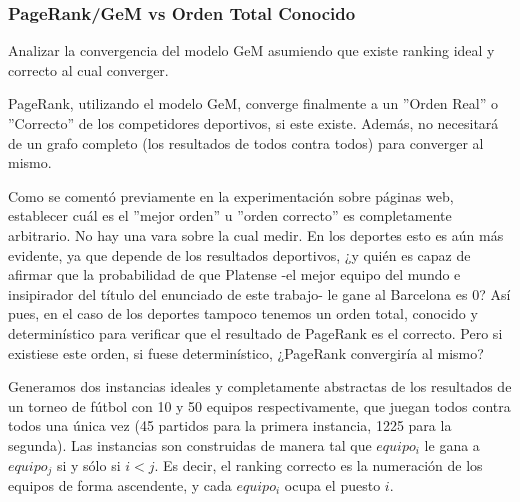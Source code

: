 \subsubsection{PageRank/GeM vs Orden Total Conocido}
\label{subsec:exp5}
\begin{LaTeXdescription}
    \item[Objetivo] Analizar la convergencia del modelo GeM asumiendo que
        existe ranking ideal y correcto al cual converger.\\

    \item[Hip\'otesis] PageRank, utilizando el modelo GeM, converge finalmente a
        un ''Orden Real'' o ''Correcto'' de los competidores deportivos, si este existe.
        Adem\'as, no necesitar\'a de un grafo completo (los resultados de todos
        contra todos) para converger al mismo.\\

    \item[Proposici\'on] Como se coment\'o previamente en la experimentaci\'on
        sobre p\'aginas web, establecer cuál es el ''mejor orden'' u ''orden
        correcto'' es completamente arbitrario. No hay una vara sobre la cual
        medir. En los deportes esto es a\'un más evidente, ya que depende de
        los resultados deportivos, ¿y qui\'en es capaz de afirmar que la
        probabilidad de que Platense -el mejor equipo del mundo e insipirador
        del t\'itulo del enunciado de este trabajo- le gane al Barcelona es $0$?
        As\'i pues, en el caso de los deportes tampoco tenemos un orden total,
        conocido y determin\'istico para verificar que el resultado de PageRank
        es el correcto. Pero si existiese este orden, si fuese determin\'istico,
        ¿PageRank convergir\'ia al mismo?\\

    \item[M\'etodo de Experimentaci\'on] Generamos dos instancias ideales y
        completamente abstractas de los resultados de un torneo de f\'utbol con
        10 y 50 equipos respectivamente, que juegan todos contra todos una
        \'unica vez (45 partidos para la primera instancia, 1225 para la
        segunda). Las instancias son construidas de manera tal que $equipo_i$ le
        gana a $equipo_j$ si y s\'olo si $i<j$. Es decir, el ranking correcto es
        la numeraci\'on de los equipos de forma ascendente, y cada $equipo_i$
        ocupa el puesto $i$.


\end{LaTeXdescription}
